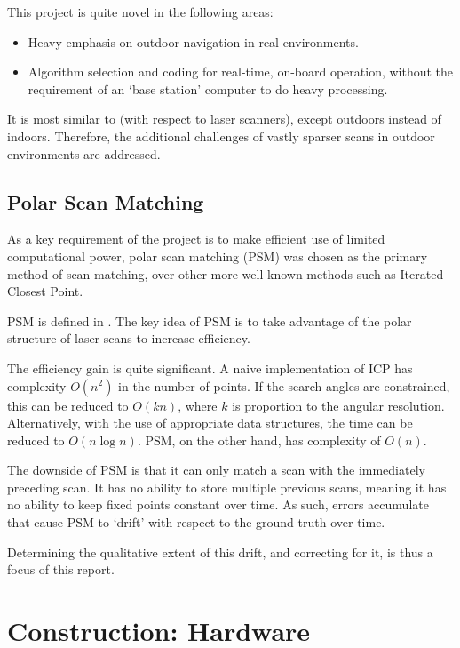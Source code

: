 \documentclass[12pt,oneside,a4paper]{book}
\begin{document}
This project is quite novel in the following areas:
\begin{itemize}
\item Heavy emphasis on outdoor navigation in real environments.
\item Algorithm selection and coding for real-time, on-board
  operation, without the requirement of an `base station' computer to
  do heavy processing.
\end{itemize}

It is most similar to \cite{achtelik2009stereo} (with respect to laser
scanners), except outdoors instead of indoors. Therefore, the
additional challenges of vastly sparser scans in outdoor environments
are addressed.

\section{Polar Scan Matching}
\label{sec:polar-scan-matching}

As a key requirement of the project is to make efficient use of
limited computational power, polar scan matching (PSM) was chosen as the
primary method of scan matching, over other more well known methods
such as Iterated Closest Point.

PSM is defined in \cite{polarscanmatching}. The key idea of PSM is to
take advantage of the polar structure of laser scans to increase
efficiency. 

The efficiency gain is quite significant. A naive implementation of
ICP has complexity $O(n^2)$ in the number of points. If the search
angles are constrained, this can be reduced to $O(kn)$, where $k$ is
proportion to the angular resolution. Alternatively, with the
use of appropriate data structures, the time can be reduced to
$O(n\log n)$. PSM, on the other hand, has complexity of $O(n)$.

The downside of PSM is that it can only match a scan with the
immediately preceding scan. It has no ability to store multiple
previous scans, meaning it has no ability to keep fixed points
constant over time. As such, errors accumulate that cause PSM to
`drift' with respect to the ground truth over time.

Determining the qualitative extent of this drift, and correcting for
it, is thus a focus of this report.

\chapter{Construction: Hardware}
\label{sec:hardware}
\end{document}
